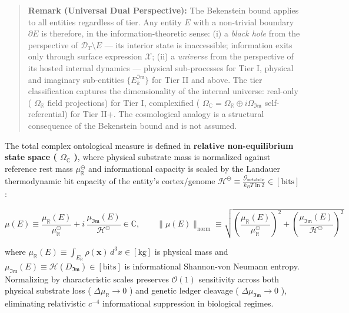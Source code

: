 \documentclass[11pt,a4paper]{article}
\theoremstyle{definition}
\theoremstyle{remark}
\begin{document}
\begin{quote}\textbf{Remark (Universal Dual Perspective):} The Bekenstein bound applies to all entities regardless of tier. Any entity $E$ with a non-trivial boundary $\partial E$ is therefore, in the information-theoretic sense: (i) a \textit{black hole} from the perspective of $\mathcal{D}_T \setminus E$ — its interior state is inaccessible; information exits only through surface expression $\mathcal{X}$; (ii) a \textit{universe} from the perspective of its hosted internal dynamics — physical sub-processes for Tier I, physical and imaginary sub-entities $\{E_k^{\mathfrak{Im}}\}$ for Tier II and above. The tier classification captures the dimensionality of the internal universe: real-only ( $\Omega_{\mathbb{R}}$ field projections) for Tier I, complexified ( $\Omega_{\mathbb{C}} = \Omega_{\mathbb{R}} \oplus i\Omega_{\mathfrak{Im}}$ self-referential) for Tier II+. The cosmological analogy is a structural consequence of the Bekenstein bound and is not assumed.\end{quote}

The total complex ontological measure is defined in \textbf{relative non-equilibrium state space ( $\Omega_{\mathbb{C}}$ )}, where physical substrate mass is normalized against reference rest mass $\mu_{\mathbb{R}}^\ominus$ and informational capacity is scaled by the Landauer thermodynamic bit capacity of the entity's cortex/genome $\mathcal{H}^\ominus \equiv \frac{\mathcal{G}_{\text{metabolic}}}{k_B T \ln 2} \in [\mathrm{bits}]$:


\begin{equation}
\boxed{\mu(E) \equiv \frac{\mu_{\mathbb{R}}(E)}{\mu_{\mathbb{R}}^\ominus} + i \, \frac{\mu_{\mathfrak{Im}}(E)}{\mathcal{H}^\ominus} \in \mathbb{C}, \qquad \|\mu(E)\|_{\text{norm}} \equiv \sqrt{\left(\frac{\mu_{\mathbb{R}}(E)}{\mu_{\mathbb{R}}^\ominus}\right)^2 + \left(\frac{\mu_{\mathfrak{Im}}(E)}{\mathcal{H}^\ominus}\right)^2}}
\end{equation}


where $\mu_{\mathbb{R}}(E) \equiv \int_{E_{\mathbb{R}}} \rho(\mathbf{x}) \, d^3x \in [\mathrm{kg}]$ is physical mass and $\mu_{\mathfrak{Im}}(E) \equiv \mathcal{H}(D_{\mathfrak{Im}}) \in [\mathrm{bits}]$ is informational Shannon-von Neumann entropy. Normalizing by characteristic scales preserves $\mathcal{O}(1)$ sensitivity across both physical substrate loss ( $\Delta \mu_{\mathbb{R}} \to 0$ ) and genetic ledger cleavage ( $\Delta \mu_{\mathfrak{Im}} \to 0$ ), eliminating relativistic $c^{-4}$ informational suppression in biological regimes.
\end{document}
